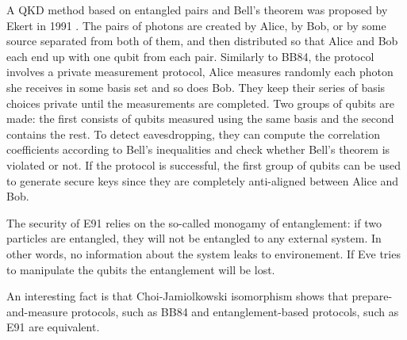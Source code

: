 \documentclass[10pt,a4paper]{book}
\numberwithin{equation}{chapter}
\numberwithin{figure}{chapter}
\numberwithin{table}{chapter}
\begin{document}
A QKD method based on entangled pairs and Bell's theorem was proposed by Ekert in 1991 \cite{crypto}. The pairs of photons are created by Alice, by Bob, or by some source separated from both of them, and then distributed so that Alice and Bob each end up with one qubit from each pair. Similarly to BB84, the protocol involves a private measurement protocol, Alice measures randomly each photon she receives in some basis set and so does Bob. They keep their series of basis choices private until the measurements are completed. Two groups of qubits are made: the first consists of qubits measured using the same basis and the second contains the rest. To detect eavesdropping, they can compute the correlation coefficients according to Bell's inequalities and check whether Bell's theorem is violated or not. If the protocol is successful, the first group of qubits can be used to generate secure keys since they are completely anti-aligned between Alice and Bob.

The security of E91 relies on the so-called monogamy of entanglement: if two particles are entangled, they will not be entangled to any external system. In other words, no information about the system leaks to environement. If Eve tries to manipulate the qubits the entanglement will be lost.

An interesting fact is that Choi-Jamiolkowski isomorphism shows that prepare-and-measure protocols, such as BB84 and entanglement-based protocols, such as E91 are equivalent.
\end{document}
